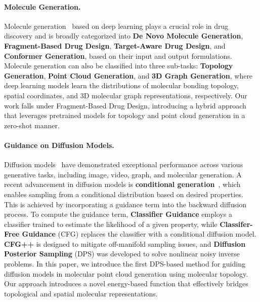 \paragraph{Molecule Generation.} Molecule generation~\citep{edm,midi,graphlatentdiffusion,liu2021graphpiece,madhawa2019graphnvp,sbdddiff} based on deep learning plays a crucial role in drug discovery and is broadly categorized into \textbf{De Novo Molecule Generation}\citep{moldiff,micam,midi,grum}, \textbf{Fragment-Based Drug Design}\citep{jin2023fflom,igashov2024difflinker,diffhop,imrie2020delinker,huang2022_3dlinker}, \textbf{Target-Aware Drug Design}\citep{targetdiff,diffdock,sbdddiff,pocket2mol}, and \textbf{Conformer Generation}\citep{geodiff,rebind,torsiondiff,confvae}, based on their input and output formulations. Molecule generation can also be classified into three sub-tasks: \textbf{Topology Generation}\citep{graphaf,micam,jin2023fflom,grum,graphpolish,graphlatentdiffusion,gldm}, \textbf{Point Cloud Generation}\citep{edm,geoldm,igashov2024difflinker,targetdiff,sbdddiff}, and \textbf{3D Graph Generation}, where deep learning models learn the distributions of molecular bonding topology, spatial coordinates, and 3D molecular graph representations, respectively. Our work falls under Fragment-Based Drug Design, introducing a hybrid approach that leverages pretrained models for topology and point cloud generation in a zero-shot manner.


\paragraph{Guidance on Diffusion Models.}
Diffusion models~\citep{ddpm,ddim,latentdiffusion,videodiffusion,grum,edm,midi} have demonstrated exceptional performance across various generative tasks, including image, video, graph, and molecular generation. A recent advancement in diffusion models is \textbf{conditional generation}~\citep{cfg,dps,mcg,classifierguidance}, which enables sampling from a conditional distribution based on desired properties. This is achieved by incorporating a guidance term into the backward diffusion process. To compute the guidance term, \textbf{Classifier Guidance} \citep{classifierguidance} employs a classifier trained to estimate the likelihood of a given property, while \textbf{Classifer-Free Guidance} (CFG) \citep{classifierguidance} replaces the classifier with a conditional diffusion model. \textbf{CFG++} \citep{mcg} is designed to mitigate off-manifold sampling issues, and \textbf{Diffusion Posterior Sampling} (DPS) \citep{dps} was developed to solve nonlinear noisy inverse problems. In this paper, we introduce the first DPS-based method for guiding diffusion models in molecular point cloud generation using molecular topology. Our approach introduces a novel energy-based function that effectively bridges topological and spatial molecular representations.

